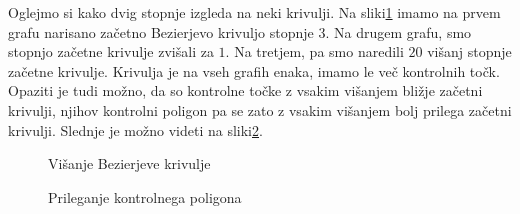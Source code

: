 \documentclass[isrm2, tisk]{fmfdelo}
\begin{document}
    Oglejmo si kako dvig stopnje izgleda na neki krivulji.
    Na sliki\ref{fig:višanje} imamo na prvem grafu narisano začetno Bezierjevo krivuljo stopnje $3$.
    Na drugem grafu, smo stopnjo začetne krivulje zvišali za $1$.
    Na tretjem, pa smo naredili $20$ višanj stopnje začetne krivulje.
    Krivulja je na vseh grafih enaka, imamo le več kontrolnih točk.
    Opaziti je tudi možno, da so kontrolne točke z vsakim višanjem bližje začetni krivulji, njihov kontrolni poligon pa se zato z vsakim višanjem bolj prilega začetni krivulji.
    Slednje je možno videti na sliki\ref{fig:višanje-poligon}.


    \begin{figure}[h]
        \centering
        \qquad
        \qquad
        \caption{Višanje Bezierjeve krivulje}
        \label{fig:višanje}
    \end{figure}

    \begin{figure}[h]
        \centering
        \qquad
        \caption{Prileganje kontrolnega poligona}
        \label{fig:višanje-poligon}
    \end{figure}
\end{document}
